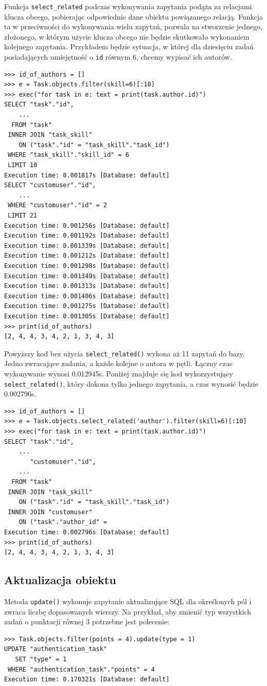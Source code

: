 \documentclass[oneside,polski,logo,indent]{amuthesis}
\begin{document}
\begin{enumerate}
\begin{enumerate}
Funkcja \texttt{select\_related} podczas wykonywania zapytania podąża za relacjami klucza obcego, pobierając odpowiednie dane obiektu powiązanego relacją.
Funkcja ta w przeciwności do wykonywania wielu zapytań, pozwala na stworzenie jednego, złożonego, w którym użycie klucza obcego nie będzie skutkowało wykonaniem kolejnego zapytania. Przykładem będzie sytuacja, w której dla dziesięciu zadań posiadających umiejętność o \texttt{id} równym 6, chcemy wypisać ich autorów.
\begin{lstlisting}[style=DOS]
>>> id_of_authors = []
>>> e = Task.objects.filter(skill=6)[:10]
>>> exec("for task in e: text = print(task.author.id)")
SELECT "task"."id",
	...
  FROM "task"
 INNER JOIN "task_skill"
    ON ("task"."id" = "task_skill"."task_id")
 WHERE "task_skill"."skill_id" = 6
 LIMIT 10
Execution time: 0.001817s [Database: default]
SELECT "customuser"."id",
	...
 WHERE "customuser"."id" = 2
 LIMIT 21
Execution time: 0.001256s [Database: default]
Execution time: 0.001192s [Database: default]
Execution time: 0.001339s [Database: default]
Execution time: 0.001212s [Database: default]
Execution time: 0.001298s [Database: default]
Execution time: 0.001349s [Database: default]
Execution time: 0.001313s [Database: default]
Execution time: 0.001406s [Database: default]
Execution time: 0.001275s [Database: default]
Execution time: 0.001305s [Database: default]
>>> print(id_of_authors)
[2, 4, 4, 3, 4, 2, 1, 3, 4, 3]
\end{lstlisting}
Powyższy kod bez użycia \texttt{select\_related()} wykona aż 11 zapytań do bazy. Jedno zwracające zadania, a każde kolejne o autora w pętli. Łączny czas wykonywanie wynosi 0.012945s. Poniżej znajduje się kod wykorzystujący \texttt{select\_related()}, który dokona tylko jednego zapytania, a czas wynosić będzie 0.002796s.
\begin{lstlisting}[style=DOS]
>>> id_of_authors = []
>>> e = Task.objects.select_related('author').filter(skill=6)[:10]
>>> exec("for task in e: text = print(task.author.id)")
SELECT "task"."id",
	...
       "customuser"."id",
	...
  FROM "task"
 INNER JOIN "task_skill"
    ON ("task"."id" = "task_skill"."task_id")
 INNER JOIN "customuser"
    ON ("task"."author_id" =
Execution time: 0.002796s [Database: default]
>>> print(id_of_authors)
[2, 4, 4, 3, 4, 2, 1, 3, 4, 3]
\end{lstlisting}
\subsection{Aktualizacja obiektu}
Metoda \texttt{update()} wykonuje zapytanie aktualizujące SQL dla określonych pól i zwraca liczbę dopasowanych wierszy. Na przykład, aby zmienić typ wszystkich zadań o punktacji równej 3 potrzebne jest polecenie:
\begin{lstlisting}[style=DOS]
>>> Task.objects.filter(points = 4).update(type = 1)
UPDATE "authentication_task"
   SET "type" = 1
 WHERE "authentication_task"."points" = 4
Execution time: 0.170321s [Database: default]
\end{lstlisting}

\end{enumerate}
\end{enumerate}
\end{document}

